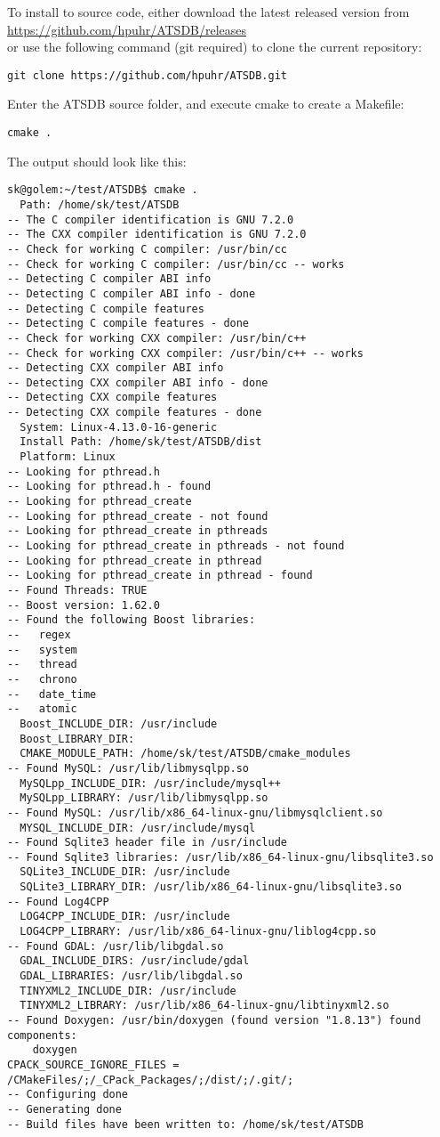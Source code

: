 To install to source code, either download the latest released version from \\ \url{https://github.com/hpuhr/ATSDB/releases} \\
or use the following command (git required) to clone the current repository:

\begin{verbatim}
git clone https://github.com/hpuhr/ATSDB.git
\end{verbatim}

Enter the ATSDB source folder, and execute cmake to create a Makefile:

\begin{verbatim}
cmake .
\end{verbatim}

The output should look like this:
\begin{verbatim}
sk@golem:~/test/ATSDB$ cmake .
  Path: /home/sk/test/ATSDB
-- The C compiler identification is GNU 7.2.0
-- The CXX compiler identification is GNU 7.2.0
-- Check for working C compiler: /usr/bin/cc
-- Check for working C compiler: /usr/bin/cc -- works
-- Detecting C compiler ABI info
-- Detecting C compiler ABI info - done
-- Detecting C compile features
-- Detecting C compile features - done
-- Check for working CXX compiler: /usr/bin/c++
-- Check for working CXX compiler: /usr/bin/c++ -- works
-- Detecting CXX compiler ABI info
-- Detecting CXX compiler ABI info - done
-- Detecting CXX compile features
-- Detecting CXX compile features - done
  System: Linux-4.13.0-16-generic
  Install Path: /home/sk/test/ATSDB/dist
  Platform: Linux
-- Looking for pthread.h
-- Looking for pthread.h - found
-- Looking for pthread_create
-- Looking for pthread_create - not found
-- Looking for pthread_create in pthreads
-- Looking for pthread_create in pthreads - not found
-- Looking for pthread_create in pthread
-- Looking for pthread_create in pthread - found
-- Found Threads: TRUE  
-- Boost version: 1.62.0
-- Found the following Boost libraries:
--   regex
--   system
--   thread
--   chrono
--   date_time
--   atomic
  Boost_INCLUDE_DIR: /usr/include
  Boost_LIBRARY_DIR: 
  CMAKE_MODULE_PATH: /home/sk/test/ATSDB/cmake_modules
-- Found MySQL: /usr/lib/libmysqlpp.so
  MySQLpp_INCLUDE_DIR: /usr/include/mysql++
  MySQLpp_LIBRARY: /usr/lib/libmysqlpp.so
-- Found MySQL: /usr/lib/x86_64-linux-gnu/libmysqlclient.so
  MYSQL_INCLUDE_DIR: /usr/include/mysql
-- Found Sqlite3 header file in /usr/include
-- Found Sqlite3 libraries: /usr/lib/x86_64-linux-gnu/libsqlite3.so
  SQLite3_INCLUDE_DIR: /usr/include
  SQLite3_LIBRARY_DIR: /usr/lib/x86_64-linux-gnu/libsqlite3.so
-- Found Log4CPP
  LOG4CPP_INCLUDE_DIR: /usr/include
  LOG4CPP_LIBRARY: /usr/lib/x86_64-linux-gnu/liblog4cpp.so
-- Found GDAL: /usr/lib/libgdal.so  
  GDAL_INCLUDE_DIRS: /usr/include/gdal
  GDAL_LIBRARIES: /usr/lib/libgdal.so
  TINYXML2_INCLUDE_DIR: /usr/include
  TINYXML2_LIBRARY: /usr/lib/x86_64-linux-gnu/libtinyxml2.so
-- Found Doxygen: /usr/bin/doxygen (found version "1.8.13") found components:
    doxygen 
CPACK_SOURCE_IGNORE_FILES = /CMakeFiles/;/_CPack_Packages/;/dist/;/.git/;
-- Configuring done
-- Generating done
-- Build files have been written to: /home/sk/test/ATSDB
\end{verbatim}

